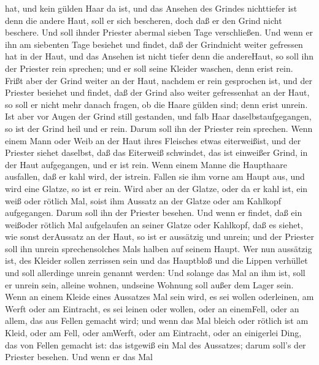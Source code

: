 hat, und kein gülden Haar da ist, und das Ansehen des Grindes
nichttiefer ist denn die andere Haut,  soll er sich
bescheren, doch daß er den Grind nicht beschere. Und soll ihnder
Priester abermal sieben Tage verschließen.  Und wenn er ihn
am siebenten Tage besiehet und findet, daß der Grindnicht weiter
gefressen hat in der Haut, und das Ansehen ist nicht tiefer denn die
andereHaut, so soll ihn der Priester rein sprechen; und er soll seine
Kleider waschen, denn erist rein.  Frißt aber der Grind
weiter an der Haut, nachdem er rein gesprochen ist,  und
der Priester besiehet und findet, daß der Grind also weiter gefressenhat
an der Haut, so soll er nicht mehr danach fragen, ob die Haare gülden
sind; denn erist unrein.  Ist aber vor Augen der Grind
still gestanden, und falb Haar daselbstaufgegangen, so ist der Grind
heil und er rein. Darum soll ihn der Priester rein sprechen.
 Wenn einem Mann oder Weib an der Haut ihres Fleisches
etwas eiterweißist,  und der Priester siehet daselbst, daß
das Eiterweiß schwindet, das ist einweißer Grind, in der Haut
aufgegangen, und er ist rein.  Wenn einem Manne die
Haupthaare ausfallen, daß er kahl wird, der istrein. 
Fallen sie ihm vorne am Haupt aus, und wird eine Glatze, so ist er rein.
 Wird aber an der Glatze, oder da er kahl ist, ein weiß
oder rötlich Mal, soist ihm Aussatz an der Glatze oder am Kahlkopf
aufgegangen.  Darum soll ihn der Priester besehen. Und wenn
er findet, daß ein weißoder rötlich Mal aufgelaufen an seiner Glatze
oder Kahlkopf, daß es siehet, wie sonst derAussatz an der Haut,
 so ist er aussätzig und unrein; und der Priester soll ihn
unrein sprechensolches Mals halben auf seinem Haupt.  Wer
nun aussätzig ist, des Kleider sollen zerrissen sein und das Hauptbloß
und die Lippen verhüllet und soll allerdinge unrein genannt werden:
 Und solange das Mal an ihm ist, soll er unrein sein,
alleine wohnen, undseine Wohnung soll außer dem Lager sein.
 Wenn an einem Kleide eines Aussatzes Mal sein wird, es sei
wollen oderleinen,  am Werft oder am Eintracht, es sei
leinen oder wollen, oder an einemFell, oder an allem, das aus Fellen
gemacht wird;  und wenn das Mal bleich oder rötlich ist am
Kleid, oder am Fell, oder amWerft, oder am Eintracht, oder an einigerlei
Ding, das von Fellen gemacht ist: das istgewiß ein Mal des Aussatzes;
darum soll's der Priester besehen.  Und wenn er das Mal
